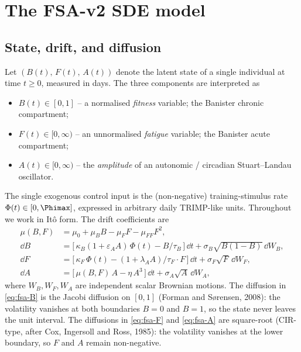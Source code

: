 \section{The FSA-v2 SDE model}\label{sec:fsa}

\subsection{State, drift, and diffusion}

Let $(B(t),\,F(t),\,A(t))$ denote the latent state of a single individual
at time $t \ge 0$, measured in days. The three components are interpreted as
\begin{itemize}
  \item $B(t) \in [0,1]$ -- a normalised \emph{fitness} variable; the
        Banister chronic compartment;
  \item $F(t) \in [0,\infty)$ -- an unnormalised \emph{fatigue} variable;
        the Banister acute compartment;
  \item $A(t) \in [0,\infty)$ -- the \emph{amplitude} of an autonomic /
        circadian Stuart--Landau oscillator.
\end{itemize}
The single exogenous control input is the (non-negative) training-stimulus
rate $\Phi(t) \in [0,\Phimax]$, expressed in arbitrary daily TRIMP-like
units. Throughout we work in It\^o form. The drift coefficients are
\begin{align}
  \mu(B,F) &= \mu_0 + \mu_B B - \mu_F F - \mu_{FF} F^2, \label{eq:fsa-mu} \\
  \dd B &= \bigl[\,\kappa_B(1+\varepsilon_A A)\,\Phi(t) - B/\tau_B\,\bigr]\,\dd t
            + \sigma_B \sqrt{B(1-B)}\,\dd W_B, \label{eq:fsa-B} \\
  \dd F &= \bigl[\,\kappa_F\,\Phi(t) - (1+\lambda_A A)/\tau_F \cdot F\,\bigr]\,\dd t
            + \sigma_F \sqrt{F}\,\dd W_F, \label{eq:fsa-F} \\
  \dd A &= \bigl[\,\mu(B,F)\,A - \eta\,A^3\,\bigr]\,\dd t
            + \sigma_A \sqrt{A}\,\dd W_A, \label{eq:fsa-A}
\end{align}
where $W_B,W_F,W_A$ are independent scalar Brownian motions. The diffusion
in \eqref{eq:fsa-B} is the Jacobi diffusion on $[0,1]$ (Forman and S\o rensen,
2008): the volatility vanishes at both boundaries $B=0$ and $B=1$, so the
state never leaves the unit interval. The diffusions in \eqref{eq:fsa-F}
and \eqref{eq:fsa-A} are square-root (CIR-type, after Cox, Ingersoll and
Ross, 1985): the volatility vanishes at the lower boundary, so $F$ and $A$
remain non-negative.

